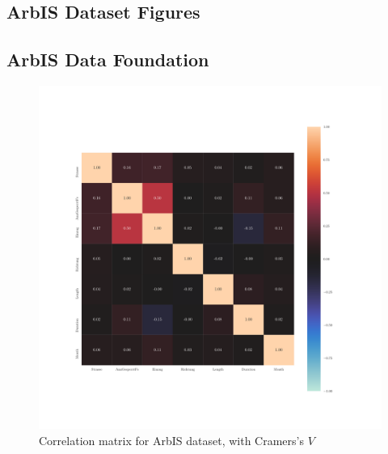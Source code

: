 \documentclass[a4paper,headsepline,footsepline,fontsize=11pt,BCOR=12mm,DIV=12]{report}
\newcommand{\nocontentsline}[3]{}
\newcommand{\tocless}[2]{\bgroup\let\addcontentsline=\nocontentsline#1{#2}\egroup}
\begin{document}
\begin{appendices}
\chapter{ArbIS Dataset Figures}

\tocless\section{ArbIS Data Foundation}
\label{appendix_arbis_dataset}



\begin{figure}[h]
	\centering
	\includegraphics[scale=0.7, trim=0cm 2cm 0cm 0cm]{../CorrAnalysis/data/ArbIS/01_dataset/plots/arbis_dataset_corr_cramers}
	\caption{Correlation matrix for ArbIS dataset, with Cramers's $V$}
	\label{img:appendix_correlation_matrix_dataset_theils}
\end{figure}
\restoregeometry


\end{appendices}
\end{document}
